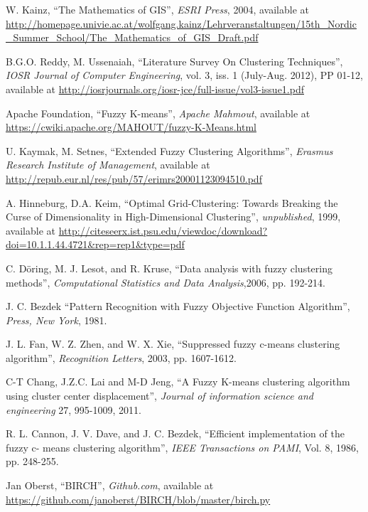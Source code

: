 \documentclass[conference, 10pt]{IEEEtran}
\begin{document}
\begin{thebibliography}{1}
   W. Kainz, ``The Mathematics of GIS'', \emph{ESRI Press}, 2004, available at
  \url{http://homepage.univie.ac.at/wolfgang.kainz/Lehrveranstaltungen/15th_Nordic_Summer_School/The_Mathematics_of_GIS_Draft.pdf}

   B.G.O. Reddy, M. Ussenaiah, ``Literature Survey On Clustering Techniques'', \emph{IOSR Journal of Computer Engineering}, vol. 3, iss. 1 (July-Aug. 2012), PP 01-12, available at
  \url{http://iosrjournals.org/iosr-jce/full-issue/vol3-issue1.pdf}

   Apache Foundation, ``Fuzzy K-means'', \emph{Apache Mahmout}, available at
  \url{https://cwiki.apache.org/MAHOUT/fuzzy-K-Means.html}

   U. Kaymak, M. Setnes, ``Extended Fuzzy Clustering Algorithms'', \emph{Erasmus Research Institute of Management}, available at
  \url{http://repub.eur.nl/res/pub/57/erimrs20001123094510.pdf}

   A. Hinneburg, D.A. Keim, ``Optimal Grid-Clustering: Towards Breaking the Curse of Dimensionality in High-Dimensional Clustering'', \emph{unpublished}, 1999, available at
  \url{http://citeseerx.ist.psu.edu/viewdoc/download?doi=10.1.1.44.4721&rep=rep1&type=pdf}  

                                               
   C. Döring, M. J. Lesot, and R. Kruse, ``Data analysis with fuzzy clustering methods'', \emph{Computational Statistics and Data Analysis},2006, pp. 192-214.

   J. C. Bezdek ``Pattern Recognition with Fuzzy Objective Function Algorithm'', \emph{Press, New York}, 1981.

   J. L. Fan, W. Z. Zhen, and W. X. Xie, ``Suppressed fuzzy c-means clustering algorithm'', \emph{ Recognition Letters}, 2003, pp. 1607-1612.

   C-T Chang, J.Z.C. Lai and M-D Jeng, ``A Fuzzy K-means clustering algorithm  using cluster center displacement'', \emph{Journal of information science and engineering} 27, 995-1009, 2011.

   R. L. Cannon, J. V. Dave, and J. C. Bezdek, ``Efficient implementation of the fuzzy c- means clustering algorithm'', \emph{IEEE Transactions on PAMI}, Vol. 8, 1986, pp. 248-255.

   Jan Oberst, ``BIRCH'', \emph{Github.com}, available at
  \url{https://github.com/janoberst/BIRCH/blob/master/birch.py}

  \end{thebibliography}

  
\end{document}
